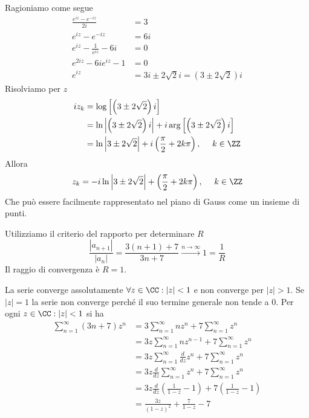 \Soluzione

Ragioniamo come segue
\begin{align*}
\frac{e^{iz} - e^{- iz}}{2i} & = 3\\
e^{iz} - e^{- iz} & = 6i\\
e^{iz} - \frac{1}{e^{iz}} - 6i & = 0\\
e^{2iz} - 6ie^{iz} - 1 & = 0\\
e^{iz} & = 3i\pm 2\sqrt{2} i = \left(3\pm 2\sqrt{2}\right) i
\end{align*}
Risolviamo per $z$
\begin{align*}
iz_{k} & = \log\left[\left(3\pm 2\sqrt{2}\right) i\right]\\
 & = \ln\left| \left(3\pm 2\sqrt{2}\right) i\right| + i\arg\left[\left(3\pm 2\sqrt{2}\right) i\right]\\
 & = \ln\left| 3\pm 2\sqrt{2}\right| + i\left(\frac{\pi}{2} + 2k\pi \right), \ \ \ \ k\in \ZZ
\end{align*}
Allora
\begin{equation*}
z_{k} = - i\ln\left| 3\pm 2\sqrt{2}\right| + \left(\frac{\pi}{2} + 2k\pi \right), \ \ \ \ k\in \ZZ
\end{equation*}
Che può essere facilmente rappresentato nel piano di Gauss come un insieme di punti.

\Soluzione

Utilizziamo il criterio del rapporto per determinare $R$
\begin{equation*}
\frac{\left| a_{n + 1}\right|}{\left| a_{n}\right|} = \frac{3\left(n + 1\right) + 7}{3n + 7}\xrightarrow{n\rightarrow \infty} 1 = \frac{1}{R}
\end{equation*}
Il raggio di convergenza è $R = 1$.

La serie converge assolutamente $\forall z\in \CC :\left| z\right| < 1$ e non converge per $\left| z\right| > 1$. Se $\left| z\right| = 1$ la serie non converge perché il suo termine generale non tende a $0$. Per ogni $z\in \CC :\left| z\right| < 1$ si ha
\begin{align*}
\sum\limits^{\infty}_{n = 1}\left(3n + 7\right) z^{n} & = 3\sum\limits^{\infty}_{n = 1} nz^{n} + 7\sum\limits^{\infty}_{n = 1} z^{n}\\
 & = 3z\sum\limits^{\infty}_{n = 1} nz^{n - 1} + 7\sum\limits^{\infty}_{n = 1} z^{n}\\
 & = 3z\sum\limits^{\infty}_{n = 1}\frac{d}{dz} z^{n} + 7\sum\limits^{\infty}_{n = 1} z^{n}\\
 & = 3z\frac{d}{dz}\sum\limits^{\infty}_{n = 1} z^{n} + 7\sum\limits^{\infty}_{n = 1} z^{n}\\
 & = 3z\frac{d}{dz}\left(\frac{1}{1 - z} - 1\right) + 7\left(\frac{1}{1 - z} - 1\right)\\
 & = \frac{3z}{\left(1 - z\right)^{2}} + \frac{7}{1 - z} - 7
\end{align*}
